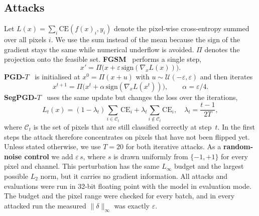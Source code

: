 \documentclass[conference]{IEEEtran}
\newcommand{\eps}{\varepsilon}
\begin{document}
\subsection{Attacks}
Let $L(x)=\sum_i \mathrm{CE}(f(x)_i,y_i)$ denote the pixel-wise cross-entropy summed over all pixels $i$. We use the sum instead of the mean because the sign of the gradient stays the same while numerical underflow is avoided. $\Pi$ denotes the projection onto the feasible set. \textbf{FGSM}~\cite{goodfellow2015explaining} performs a single step,
\begin{equation}
x' = \Pi\big(x + \eps\,\mathrm{sign}(\nabla_x L(x))\big).
\end{equation}
\textbf{PGD-$T$}~\cite{madry2018towards} is initialised at $x^0=\Pi(x+u)$ with $u\sim\mathcal{U}(-\eps,\eps)$ and then iterates
\begin{equation}
x^{t+1} = \Pi\big(x^t + \alpha\,\mathrm{sign}(\nabla_x L(x^t))\big),\qquad \alpha=\eps/4 .
\end{equation}
\textbf{SegPGD-$T$}~\cite{gu2022segpgd} uses the same update but changes the loss over the iterations,
\begin{equation}
L_t(x) = (1-\lambda_t)\!\!\sum_{i\in\mathcal{C}_t}\!\mathrm{CE}_i + \lambda_t\!\!\sum_{i\notin\mathcal{C}_t}\!\mathrm{CE}_i,\quad \lambda_t=\frac{t-1}{2T},
\end{equation}
where $\mathcal{C}_t$ is the set of pixels that are still classified correctly at step~$t$. In the first steps the attack therefore concentrates on pixels that have not been flipped yet. Unless stated otherwise, we use $T=20$ for both iterative attacks. As a \textbf{random-noise control} we add $\eps\,s$, where $s$ is drawn uniformly from $\{-1,+1\}$ for every pixel and channel. This perturbation has the same $L_\infty$ budget and the largest possible $L_2$ norm, but it carries no gradient information. All attacks and evaluations were run in 32-bit floating point with the model in evaluation mode. The budget and the pixel range were checked for every batch, and in every attacked run the measured $\|\delta\|_\infty$ was exactly $\eps$.
\end{document}
